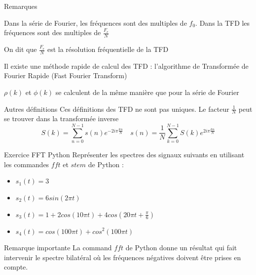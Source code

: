 \documentclass{beamer}
\begin{document}
\begin{frame}
\begin{alertblock}{Remarques}
\itemize\justifying
\item Dans la série de Fourier, les fréquences sont des multiples de $f_0$. Dans
la TFD les fréquences sont des multiples de $\frac{F_e}{N}$
\item On dit que $\frac{F_e}{N}$ est la résolution fréquentielle de la TFD
\item Il existe une méthode rapide de calcul des TFD : l'algorithme de
Transformée de Fourier Rapide (Fast Fourier Transform)
\item $\rho(k)$ et $\phi(k)$ se calculent de la même manière que pour la série
de Fourier
\end{alertblock}
\pause
\begin{block}{Autres définitions}
Ces définitions des TFD ne sont pas uniques. Le facteur $\frac{1}{N}$ peut se
trouver dans la transformée inverse
\[
S(k) = \sum_{n=0}^{N-1}s(n)e^{-2i\pi \frac{kn}{N}} \quad s(n) =
\frac{1}{N}\sum_{k=0}^{N-1}S(k)e^{2i\pi \frac{kn}{N}}
\]
\end{block}
\end{frame}

\begin{frame}
\begin{exampleblock}{Exercice FFT Python}
Représenter les spectres des signaux suivants en utilisant les commandes $fft$ et $stem$ de Python :
\begin{itemize}
  \item $s_1(t) = 3$
  \item $s_2(t) = 6sin(2\pi t)$
  \item $s_3(t) = 1 + 2cos(10\pi t) + 4cos(20\pi t + \frac{\pi}{6})$
  \item $s_4(t) = cos(100\pi t) + cos^2(100\pi t)$
\end{itemize}
\end{exampleblock}
\pause
\begin{alertblock}{Remarque importante}
\justifying
La command $fft$ de Python donne un résultat qui fait intervenir le spectre bilatéral où les fréquences négatives doivent être prises en compte.
\end{alertblock}
\end{frame}
\end{document}
